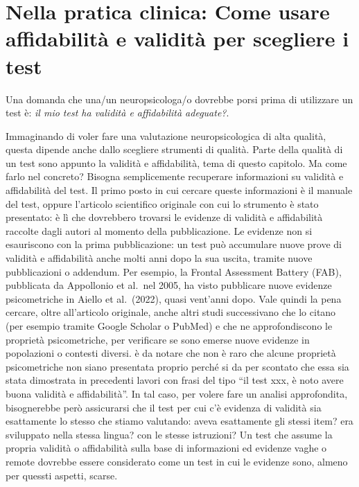 \documentclass[
  italian,
  letterpaper,
  paper=6in:9in,
  pagesize=pdftex,
  headinclude=on,
  footinclude=on,
  11pt]{scrbook}
\begin{document}
\section{Nella pratica clinica: Come usare affidabilità e validità per
scegliere i
test}\label{nella-pratica-clinica-come-usare-affidabilituxe0-e-validituxe0-per-scegliere-i-test}

Una domanda che una/un neuropsicologa/o dovrebbe porsi prima di
utilizzare un test è: \emph{il mio test ha validità e affidabilità
adeguate?}.

Immaginando di voler fare una valutazione neuropsicologica di alta
qualità, questa dipende anche dallo scegliere strumenti di qualità.
Parte della qualità di un test sono appunto la validità e affidabilità,
tema di questo capitolo. Ma come farlo nel concreto? Bisogna
semplicemente recuperare informazioni su validità e affidabilità del
test. Il primo posto in cui cercare queste informazioni è il manuale del
test, oppure l'articolo scientifico originale con cui lo strumento è
stato presentato: è lì che dovrebbero trovarsi le evidenze di validità e
affidabilità raccolte dagli autori al momento della pubblicazione. Le
evidenze non si esauriscono con la prima pubblicazione: un test può
accumulare nuove prove di validità e affidabilità anche molti anni dopo
la sua uscita, tramite nuove pubblicazioni o addendum. Per esempio, la
Frontal Assessment Battery (FAB), pubblicata da Appollonio et al.~nel
2005, ha visto pubblicare nuove evidenze psicometriche in Aiello et
al.~(2022), quasi vent'anni dopo. Vale quindi la pena cercare, oltre
all'articolo originale, anche altri studi successivano che lo citano
(per esempio tramite Google Scholar o PubMed) e che ne approfondiscono
le proprietà psicometriche, per verificare se sono emerse nuove evidenze
in popolazioni o contesti diversi. è da notare che non è raro che alcune
proprietà psicometriche non siano presentata proprio perché si da per
scontato che essa sia stata dimostrata in precedenti lavori con frasi
del tipo ``il test xxx, è noto avere buona validità e affidabilità''. In
tal caso, per volere fare un analisi approfondita, bisognerebbe però
assicurarsi che il test per cui c'è evidenza di validità sia esattamente
lo stesso che stiamo valutando: aveva esattamente gli stessi item? era
sviluppato nella stessa lingua? con le stesse istruzioni? Un test che
assume la propria validità o affidabilità sulla base di informazioni ed
evidenze vaghe o remote dovrebbe essere considerato come un test in cui
le evidenze sono, almeno per quessti aspetti, scarse.
\end{document}
